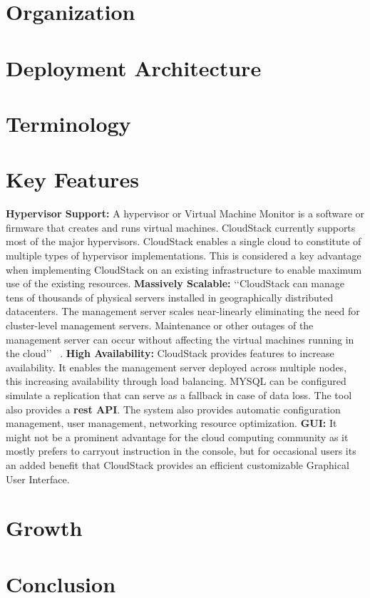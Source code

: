 \section{Organization}

\section{Deployment Architecture}

\section{Terminology}

\section{Key Features}
{\bf Hypervisor Support: } A hypervisor or Virtual Machine Monitor is a software or firmware that creates and runs virtual machines. CloudStack currently supports most of the major hypervisors.  CloudStack enables a single cloud to constitute of multiple types of hypervisor implementations. This is considered a key advantage when implementing CloudStack on an existing infrastructure to enable maximum use of the existing resources. {\bf Massively Scalable:} ‘‘CloudStack can manage tens of thousands of physical servers installed in geographically distributed datacenters. The management server scales near-linearly eliminating the need for cluster-level management servers. Maintenance or other outages of the management server can occur without affecting the virtual machines running in the cloud’’ ~\cite{hid-sp18-417-www-cloudstack-scalability}. {\bf High Availability:} CloudStack provides features to increase availability. It enables the management server deployed across multiple nodes, this increasing availability through load balancing. MYSQL can be configured simulate a replication that can serve as a fallback in case of data loss. The tool also provides a {\bf rest API}. The system also provides automatic configuration management, user management, networking resource optimization. {\bf GUI: } It might not be a prominent advantage for the cloud computing community as it mostly prefers to carryout instruction in the console, but for occasional users its an added benefit that CloudStack provides an efficient customizable Graphical User Interface.

\section{Growth}

\section{Conclusion}


 
